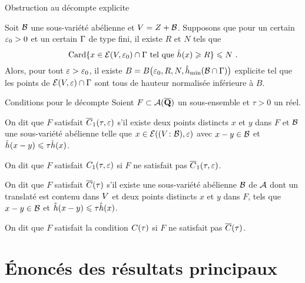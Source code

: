 \documentclass{mpg-thslides}
\begin{document}
\begin{frame}{Obstruction au décompte explicite}
  \begin{coro}
    Soit \( \mathcal B \) une sous-variété abélienne et \( V = Z + \mathcal B \).
    Supposons que pour un certain \( \varepsilon_0 > 0 \) et un certain \( \Gamma \) de
    type fini, il existe \( R \) et \( N \) tels que
    \begin{equation}
      \operatorname{Card}
      \lbrace
        x \in \mathcal E(V, \varepsilon_0) \cap \Gamma
        \text{ tel que }
        \hat h (x) \geqslant R
      \rbrace
      \leqslant
      N
      \text{ .}
    \end{equation}
    Alors, pour tout \( \varepsilon > \varepsilon_0 \), il existe \( B = B\bigl(\varepsilon_0, R,
      N, \hat h_{\mathrm{min}}(\mathcal B \cap \Gamma)\bigr) \) explicite tel que les points de \(
      \mathcal E(V, \varepsilon) \cap \Gamma \) sont tous de hauteur normalisée
    inférieure à \( B \).
  \end{coro}
\end{frame}

\begin{frame}{Conditions pour le décompte}
  Soient \( F \subset \mathcal A(\overline{{\mathbf{Q}}}) \) un sous-ensemble et \( \tau > 0 \) un
  réel.
  \begin{tdef}
    On dit que \( F \) satisfait \( \condi*\tau\eps \) s'il existe deux points
    distincts \( x \) et \( y \) dans \( F \) et \( \mathcal B \) une sous-variété
    abélienne telle que \( x \in \mathcal E((V\colon\mathcal B), \varepsilon) \) avec \( x - y
      \in \mathcal B \) et \( \hat h ( x-y ) \leqslant \tau \hat h (x) \).

    On dit que \( F \) satisfait \( \condi\tau\eps \) si \( F \)
    ne satisfait pas \( \condi*\tau\eps \).
  \end{tdef}

  \begin{tdef}
    On dit que \( F \) satisfait \( \cond*\tau \) s'il existe une
    sous-variété abélienne \( \mathcal B \) de \( \mathcal A \) dont un translaté est contenu
    dans \( V \) et deux points distincts \( x \) et \( y \) dans \( F \),
    tels que \( x - y \in \mathcal B \) et \( \hat h ( x-y ) \leqslant \tau \hat h (x) \).

    On dit que \( F \) satisfait la condition \( \cond\tau \) si \( F \) ne
    satisfait pas \( \cond*\tau \).
  \end{tdef}
\end{frame}



\section[Résultats]{Énoncés des résultats principaux}
\tocsect
\end{document}
